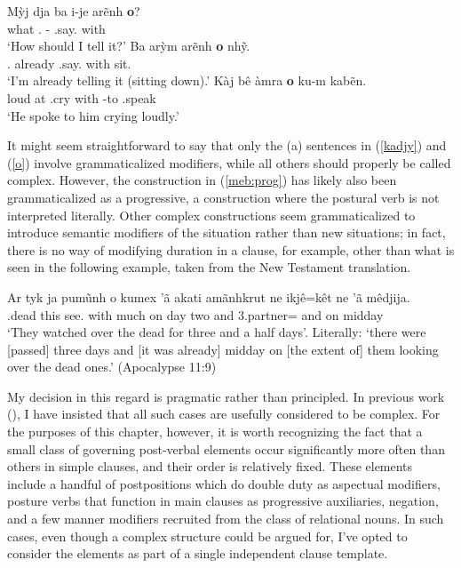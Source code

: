 \documentclass[output=paper]{langscibook}
\begin{document}
    \ex\label{o}\ea\gll Mỳj dja ba i-je arẽnh {\bfseries o}?\\
        what \Fut{} \First.\Nom{} \First-\Erg{} \Third.say.\Nfin{} with\\
      \glt `How should I tell it?'
    \ex\label{meb:prog}\gll Ba arỳm arẽnh {\bfseries o} nhỹ.\\
        \First.\Nom{} already \Third.say.\Nfin{} with sit.\Fin{}\\
      \glt `I'm already telling it (sitting down).'
    \ex\gll Kàj bê àmra {\bfseries o} ku-m kabẽn.\\
        loud at \Third.cry with \Third\Acc{}-to \Third.speak\\
      \glt `He spoke to him crying loudly.'
    \z
\z

It might seem straightforward to say that only the (a) sentences in (\ref{kadjy}) and (\ref{o}) involve grammaticalized modifiers, while all others should properly be called complex. However, the construction in (\ref{meb:prog}) has likely also been grammaticalized as a progressive, a construction where the postural verb is not interpreted literally. Other  complex constructions seem grammaticalized to introduce semantic modifiers of the situation rather than new situations; in fact, there is no way of modifying duration in a clause, for example, other than what is seen in the following example, taken from the New Testament translation.

\ea\label{complexity}\gll Ar tyk ja pumũnh o kumex 'ã akati amãnhkrut ne ikjê=kêt ne 'ã mêdjija.\\
      \Pauc{} \Third.dead this see.\Nfin{} with much on day two and 3.partner=\Neg{} and on midday\\
    \glt `They watched over the dead for three and a half days'. Literally: `there were [passed] three days and [it was already] midday on [the extent of] them looking over the dead ones.' (Apocalypse 11:9)
\z

My decision in this regard is pragmatic rather than principled. In previous work (\citealt{salanova:amerindia}), I have insisted that all such cases are usefully considered to be complex. For the purposes of this chapter, however, it is worth recognizing the fact that a small class of governing post-verbal elements occur significantly more often than others in  simple clauses, and their order is relatively fixed. These elements include a handful of postpositions which do double duty as aspectual modifiers, posture verbs that function in main clauses as progressive auxiliaries, negation, and a few manner modifiers recruited from the class of relational nouns. In such cases, even though a complex structure could be argued for, I've opted to consider the elements as part of a single independent clause template.
\end{document}

